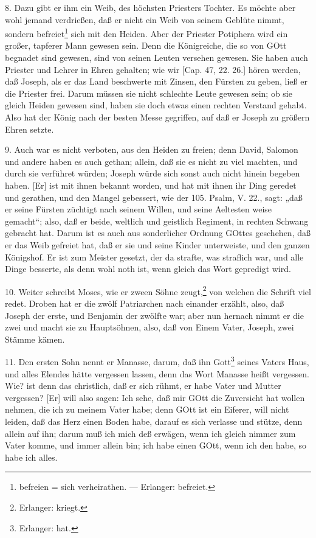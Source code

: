 8. Dazu gibt er ihm ein Weib, des höchsten Priesters Tochter. Es möchte aber wohl jemand verdrießen, daß er nicht ein Weib von seinem Geblüte nimmt, sondern befreiet\footnote{befreien = sich verheirathen. — Erlanger: befreiet.} sich mit den Heiden. Aber der Priester Potiphera wird ein großer, tapferer Mann gewesen sein. Denn die Königreiche, die so von GOtt begnadet sind gewesen, sind von seinen Leuten versehen gewesen. Sie haben auch Priester und Lehrer in Ehren gehalten; wie wir [Cap. 47, 22. 26.] hören werden, daß Joseph, als er das Land beschwerte mit Zinsen, den Fürsten zu geben, ließ er die Priester frei. Darum müssen sie nicht schlechte Leute gewesen sein; ob sie gleich Heiden gewesen sind, haben sie doch etwas einen rechten Verstand gehabt. Also hat der König nach der besten Messe gegriffen, auf daß er Joseph zu größern Ehren setzte.

9. Auch war es nicht verboten, aus den Heiden zu freien; denn David, Salomon und andere haben es auch gethan; allein, daß sie es nicht zu viel machten, und durch sie verführet würden; Joseph würde sich sonst auch nicht hinein begeben haben. [Er] ist mit ihnen bekannt worden, und hat mit ihnen ihr Ding geredet und gerathen, und den Mangel gebessert, wie der 105. Psalm, V. 22., sagt: „daß er seine Fürsten züchtigt nach seinem Willen, und seine Aeltesten weise gemacht“; also, daß er beide, weltlich
und geistlich Regiment, in rechten Schwang gebracht hat. Darum ist es auch aus sonderlicher Ordnung GOttes geschehen, daß er das Weib gefreiet hat, daß er sie und seine Kinder unterweiste, und den ganzen Königshof. Er ist zum Meister gesetzt, der da strafte, was straflich war, und alle Dinge besserte, als denn wohl noth ist, wenn gleich das Wort gepredigt wird.

10. Weiter schreibt Moses, wie er zween Söhne zeugt,\footnote{Erlanger: kriegt.} von welchen die Schrift viel redet. Droben hat er die zwölf Patriarchen nach einander erzählt, also, daß Joseph der erste, und Benjamin der zwölfte war; aber nun hernach nimmt er die zwei und macht sie zu Hauptsöhnen, also, daß von Einem Vater, Joseph, zwei Stämme kämen.

11. Den ersten Sohn nennt er Manasse, darum, daß ihn Gott\footnote{Erlanger: hat.} seines Vaters Haus, und alles Elendes hätte vergessen lassen, denn das Wort Manasse heißt vergessen. Wie? ist denn das christlich, daß er sich rühmt, er habe Vater und Mutter vergessen? [Er] will also sagen: Ich sehe, daß mir GOtt die Zuversicht hat wollen nehmen, die ich zu meinem Vater habe; denn GOtt ist ein Eiferer, will nicht leiden, daß das Herz einen Boden habe, darauf es sich verlasse und stütze, denn allein auf ihn; darum muß ich mich deß erwägen, wenn ich gleich nimmer zum Vater komme, und immer allein bin; ich habe einen GOtt, wenn ich den habe, so habe ich alles.

